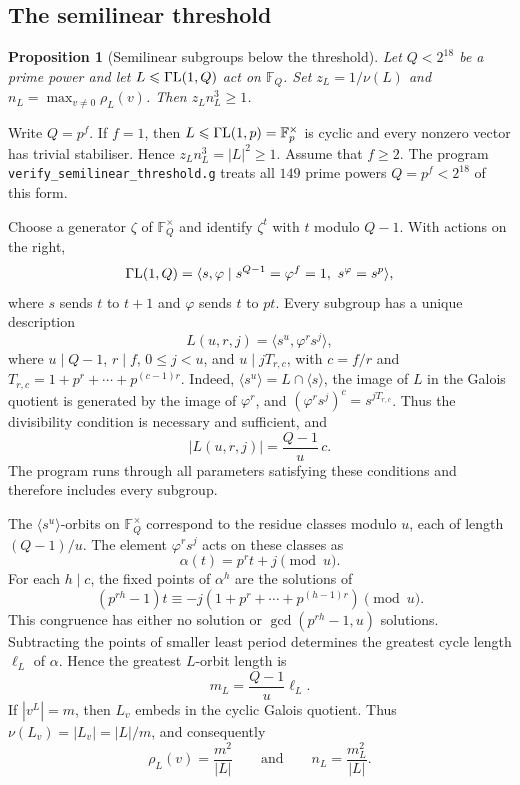 \documentclass[10pt]{amsart}
\newtheorem{proposition}[theorem]{Proposition}
\theoremstyle{definition}
\renewcommand{\le}{\leqslant}
\renewcommand{\ge}{\geqslant}
\renewcommand{\leq}{\leqslant}
\renewcommand{\geq}{\geqslant}
\let\oldendproof\endproof
\renewenvironment{proof}[1][\proofname]{%
  \oldproof[\bfseries #1]%
}{\oldendproof}
\newcommand{\GammaL}{\Gamma{\rm L}}
\numberwithin{equation}{section}
\numberwithin{table}{section}
\begin{document}
\subsection{The semilinear threshold}
\label{sec:comp-threshold}

\begin{proposition}[Semilinear subgroups below the threshold]\label{prop:semilinear-finite}
Let $Q<2^{18}$ be a prime power and let $L\le\GammaL(1,Q)$ act on $\mathbb{F}_Q$.
Set $z_L=1/\nu(L)$ and $n_L=\max_{v\ne0}\rho_L(v)$. Then $z_Ln_L^{3}\ge1$.
\end{proposition}

\begin{proof}
Write $Q=p^f$. If $f=1$, then
$L\leq\GammaL(1,p)=\mathbb{F}_p^\times$ is cyclic and every nonzero
vector has trivial stabiliser. Hence $z_Ln_L^3=|L|^2\geq1$.
Assume that $f\geq2$. The program
\texttt{verify\_semilinear\_threshold.g} treats all $149$ prime powers
$Q=p^f<2^{18}$ of this form.

Choose a generator $\zeta$ of $\mathbb{F}_Q^\times$ and identify
$\zeta^t$ with $t$ modulo $Q-1$. With actions on the right,
$$
 \GammaL(1,Q)=
 \langle s,\varphi\mid s^{Q-1}=\varphi^f=1,\ s^\varphi=s^p\rangle,
$$
where $s$ sends $t$ to $t+1$ and $\varphi$ sends $t$ to $pt$.
Every subgroup has a unique description
$$
 L(u,r,j)=\langle s^u,\varphi^rs^j\rangle,
$$
where $u\mid Q-1$, $r\mid f$, $0\leq j<u$, and
$u\mid jT_{r,c}$, with
$c=f/r$ and
$T_{r,c}=1+p^r+\cdots+p^{(c-1)r}$.
Indeed, $\langle s^u\rangle=L\cap\langle s\rangle$, the image of $L$
in the Galois quotient is generated by the image of $\varphi^r$, and
$(\varphi^rs^j)^c=s^{jT_{r,c}}$.
Thus the divisibility condition is necessary and sufficient, and
$$
 |L(u,r,j)|=\frac{Q-1}{u}\,c.
$$
The program runs through all parameters satisfying these conditions
and therefore includes every subgroup.

The $\langle s^u\rangle$-orbits on $\mathbb{F}_Q^\times$ correspond to
the residue classes modulo $u$, each of length $(Q-1)/u$.
The element $\varphi^rs^j$ acts on these classes as
$$
 \alpha(t)=p^rt+j\pmod u.
$$
For each $h\mid c$, the fixed points of $\alpha^h$ are the solutions of
$$
 (p^{rh}-1)t\equiv
 -j(1+p^r+\cdots+p^{(h-1)r})\pmod u.
$$
This congruence has either no solution or
$\gcd(p^{rh}-1,u)$ solutions. Subtracting the points of smaller least
period determines the greatest cycle length $\ell_L$ of $\alpha$.
Hence the greatest $L$-orbit length is
$$
 m_L=\frac{Q-1}{u}\ell_L.
$$
If $|v^L|=m$, then $L_v$ embeds in the cyclic Galois quotient. Thus
$\nu(L_v)=|L_v|=|L|/m$, and consequently
$$
 \rho_L(v)=\frac{m^2}{|L|}
 \qquad\text{and}\qquad
 n_L=\frac{m_L^2}{|L|}.
$$


\end{proof}
\end{document}
